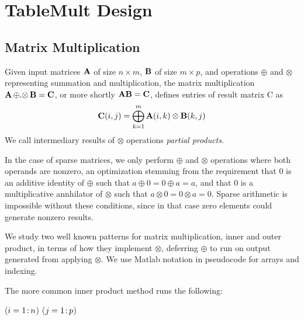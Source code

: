 
\section{TableMult Design}
\label{sDesign}


\subsection{Matrix Multiplication}
\label{sMatMul}
Given input matrices $\mathbf{A}$ of size $n \times m$, $\mathbf{B}$ of size $m \times p$,
and operations $\oplus$ and $\otimes$ representing summation and multiplication,
the matrix multiplication $\mathbf{A} \,{\oplus}.{\otimes}\, \mathbf{B} = \mathbf{C}$, or more shortly $\mathbf{A}\mathbf{B} = \mathbf{C}$,
defines entries of result matrix C as 
\[ \mathbf{C}(i,j) = \bigoplus_{k=1}^m \mathbf{A}(i,k) \otimes \mathbf{B}(k,j) \]
We call intermediary results of $\otimes$ operations \emph{partial products}.

In the case of sparse matrices, we only perform $\oplus$ and $\otimes$ operations where both operands are nonzero,
an optimization stemming from the requirement that 0 is an additive identity of $\oplus$ such that $a \oplus 0 = 0 \oplus a = a$,
and that 0 is a multiplicative annhilator of $\otimes$ such that $a \otimes 0 = 0 \otimes a = 0$.
Sparse arithmetic is impossible without these conditions, since in that case zero elements could generate nonzero results.



We study two well known patterns for matrix multiplication,
inner and outer product, in terms of how they implement $\otimes$,
deferring $\oplus$ to run on output generated from applying $\otimes$.
We use Matlab notation in pseudocode for arrays and indexing.

The more common inner product method runs the following:
\begin{algorithm}[h]
\fore($i = 1\colon\! n$){
\fore($j = 1\colon\! p$){
}}
\end{algorithm}

